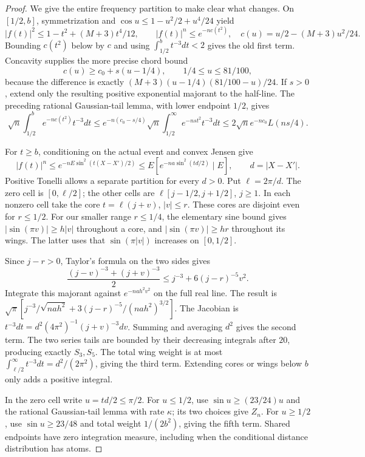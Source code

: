 \documentclass[11pt,a4paper]{article}
\numberwithin{equation}{section}
\theoremstyle{definition}
\theoremstyle{remark}
\begin{document}
\begin{proof}
We give the entire frequency partition to make clear what changes.
On $[1/2,b]$, symmetrization and
$\cos u\le1-u^2/2+u^4/24$ yield
\[
 |f(t)|^2\le1-t^2+(M+3)t^4/12,
 \qquad |f(t)|^n\le e^{-n c(t^2)},
 \quad c(u)=u/2-(M+3)u^2/24.
\]
Bounding $c(t^2)$ below by $c$ and using
$\int_{1/2}^{b}t^{-3}dt<2$ gives the old first term.
Concavity supplies the more precise chord bound
\[
 c(u)\ge c_0+s(u-1/4),\qquad 1/4\le u\le81/100,
\]
because the difference is exactly
$(M+3)(u-1/4)(81/100-u)/24$. If $s>0$, extend only the resulting
positive exponential majorant to the half-line. The preceding rational
Gaussian-tail lemma, with lower endpoint $1/2$, gives
\[
 \sqrt n\int_{1/2}^{b}e^{-nc(t^2)}t^{-3}dt
 \le e^{-n(c_0-s/4)}\sqrt n
       \int_{1/2}^{\infty}e^{-ns t^2}t^{-3}dt
 \le2\sqrt n e^{-nc_0}L(ns/4).
\]

For $t\ge b$, conditioning on the actual event and convex Jensen give
\[
 |f(t)|^n\le e^{-nE\sin^2(t(X-X')/2)}
 \le E[e^{-na\sin^2(td/2)}\mid E],\qquad d=|X-X'|.
\]
Positive Tonelli allows a separate partition for every $d>0$.
Put $\ell=2\pi/d$. The zero cell is $[0,\ell/2]$; the other cells are
$\ell[j-1/2,j+1/2]$, $j\ge1$. In each nonzero cell take the core
$t=\ell(j+v)$, $|v|\le r$. These cores are disjoint even for $r\le1/2$.
For our smaller range $r\le1/4$, the elementary sine bound gives
$|\sin(\pi v)|\ge h|v|$ throughout a core, and
$|\sin(\pi v)|\ge hr$ throughout its wings. The latter uses that
$\sin(\pi|v|)$ increases on $[0,1/2]$.

Since $j-r>0$, Taylor's formula on the two sides gives
\[
 \frac{(j-v)^{-3}+(j+v)^{-3}}2
 \le j^{-3}+6(j-r)^{-5}v^2.
\]
Integrate this majorant against $e^{-nah^2v^2}$ on the full real line.
The result is
$\sqrt\pi[j^{-3}/\sqrt{nah^2}
  +3(j-r)^{-5}/(nah^2)^{3/2}]$.
The Jacobian is
$t^{-3}dt=d^2(4\pi^2)^{-1}(j+v)^{-3}dv$.
Summing and averaging $d^2$ gives the second term. The two series tails
are bounded by their decreasing integrals after $20$, producing exactly
$S_3,S_5$. The total wing weight is at most
$\int_{\ell/2}^{\infty}t^{-3}dt=d^2/(2\pi^2)$, giving the third term.
Extending cores or wings below $b$ only adds a positive integral.

In the zero cell write $u=td/2\le\pi/2$.
For $u\le1/2$, use $\sin u\ge(23/24)u$ and the rational
Gaussian-tail lemma with rate $\kappa$; its two choices give $Z_n$.
For $u\ge1/2$, use $\sin u\ge23/48$ and total weight
$1/(2b^2)$, giving the fifth term. Shared endpoints have zero integration
measure, including when the conditional distance distribution has atoms.


\end{proof}
\end{document}
